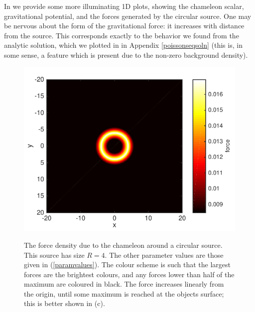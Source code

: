 \documentclass[a4paper, 12pt]{article}
\numberwithin{equation}{section}
\begin{document}
In  we provide some more illuminating 1D plots, showing the chameleon scalar, gravitational potential, and the forces generated by the circular source. One may be nervous about the form of the gravitational force: it increases with distance from the source. This corresponds exactly to the behavior we found from the analytic solution, which we plotted in  in Appendix \ref{poissonseqsoln} (this is, in some sense, a feature which is present due to the non-zero background density).

\begin{figure}[!t]
      \begin{center}
{\includegraphics[scale=0.8,angle=0]{images/sp_lorho_force_final.pdf}}
      \end{center}
\caption{ The force density due to the chameleon around a circular source. This source has size $R=4$. The other parameter values are those given in (\ref{paramvalues}).   The colour scheme is such that the largest forces are the brightest colours, and any forces lower than half of the maximum are coloured in black.  The force increases linearly from the origin, until some maximum is reached at the objects surface; this is better shown in (c).}\label{fig:circ}
\end{figure}
\end{document}
